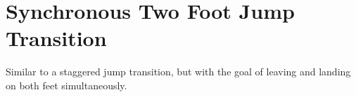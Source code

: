 \section{Synchronous Two Foot Jump Transition}
\label{sec:transitions/jump_double}

Similar to a staggered jump transition, but with the goal of leaving and landing on both feet simultaneously.  


